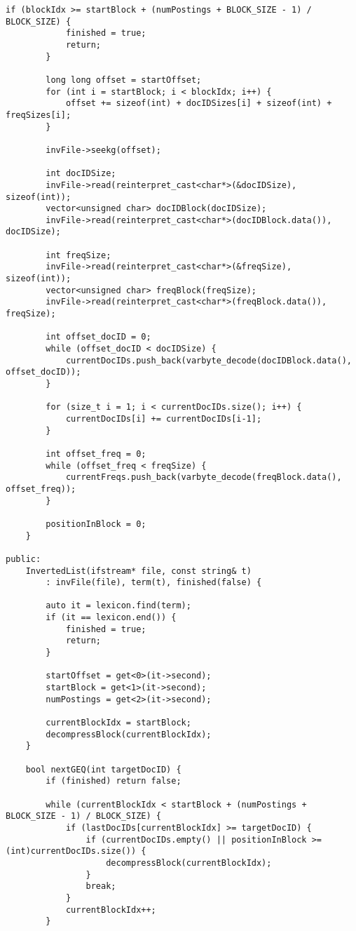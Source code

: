 \documentclass{article}
\begin{document}
\begin{lstlisting}[caption={The complete source code for the query processor component.}, label={lst:query}]
        if (blockIdx >= startBlock + (numPostings + BLOCK_SIZE - 1) / BLOCK_SIZE) {
            finished = true;
            return;
        }
        
        long long offset = startOffset;
        for (int i = startBlock; i < blockIdx; i++) {
            offset += sizeof(int) + docIDSizes[i] + sizeof(int) + freqSizes[i];
        }
        
        invFile->seekg(offset);
        
        int docIDSize;
        invFile->read(reinterpret_cast<char*>(&docIDSize), sizeof(int));
        vector<unsigned char> docIDBlock(docIDSize);
        invFile->read(reinterpret_cast<char*>(docIDBlock.data()), docIDSize);
        
        int freqSize;
        invFile->read(reinterpret_cast<char*>(&freqSize), sizeof(int));
        vector<unsigned char> freqBlock(freqSize);
        invFile->read(reinterpret_cast<char*>(freqBlock.data()), freqSize);
        
        int offset_docID = 0;
        while (offset_docID < docIDSize) {
            currentDocIDs.push_back(varbyte_decode(docIDBlock.data(), offset_docID));
        }
        
        for (size_t i = 1; i < currentDocIDs.size(); i++) {
            currentDocIDs[i] += currentDocIDs[i-1];
        }
        
        int offset_freq = 0;
        while (offset_freq < freqSize) {
            currentFreqs.push_back(varbyte_decode(freqBlock.data(), offset_freq));
        }
        
        positionInBlock = 0;
    }
    
public:
    InvertedList(ifstream* file, const string& t) 
        : invFile(file), term(t), finished(false) {
        
        auto it = lexicon.find(term);
        if (it == lexicon.end()) {
            finished = true;
            return;
        }
        
        startOffset = get<0>(it->second);
        startBlock = get<1>(it->second);
        numPostings = get<2>(it->second);
        
        currentBlockIdx = startBlock;
        decompressBlock(currentBlockIdx);
    }
    
    bool nextGEQ(int targetDocID) {
        if (finished) return false;
        
        while (currentBlockIdx < startBlock + (numPostings + BLOCK_SIZE - 1) / BLOCK_SIZE) {
            if (lastDocIDs[currentBlockIdx] >= targetDocID) {
                if (currentDocIDs.empty() || positionInBlock >= (int)currentDocIDs.size()) {
                    decompressBlock(currentBlockIdx);
                }
                break;
            }
            currentBlockIdx++;
        }
        

\end{lstlisting}
\end{document}
